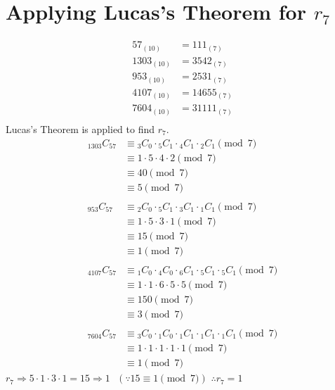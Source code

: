 \documentclass[12pt]{report}
\begin{document}
\section*{Applying Lucas's Theorem for $r_7$}
\begin{align*}
57_{(10)}&=111_{(7)} \\
1303_{(10)}&=3542_{(7)} \\
953_{(10)}&=2531_{(7)} \\
4107_{(10)}&=14655_{(7)} \\
7604_{(10)}&=31111_{(7)} \\
\end{align*}
Lucas's Theorem is applied to find $r_7$.
\begin{align*}
    {}_{1303}C_{57}
    &\equiv {}_{3}C_{0}\cdot{}_{5}C_{1}\cdot{}_{4}C_{1}\cdot{}_{2}C_{1} \pmod{7} \\
    &\equiv 1\cdot5\cdot4\cdot2 \pmod{7} \\
    &\equiv 40 \pmod{7} \\
    &\equiv 5 \pmod{7}
    \\\\
    {}_{953}C_{57}
    &\equiv {}_{2}C_{0}\cdot{}_{5}C_{1}\cdot{}_{3}C_{1}\cdot{}_{1}C_{1} \pmod{7} \\
    &\equiv 1\cdot5\cdot3\cdot1 \pmod{7} \\
    &\equiv 15 \pmod{7} \\
    &\equiv 1 \pmod{7}
    \\\\
    {}_{4107}C_{57}
    &\equiv {}_{1}C_{0}\cdot{}_{4}C_{0}\cdot{}_{6}C_{1}\cdot{}_{5}C_{1}\cdot{}_{5}C_{1} \pmod{7} \\
    &\equiv 1\cdot1\cdot6\cdot5\cdot5 \pmod{7} \\
    &\equiv 150 \pmod{7} \\
    &\equiv 3 \pmod{7}
    \\\\
    {}_{7604}C_{57}
    &\equiv {}_{3}C_{0}\cdot{}_{1}C_{0}\cdot{}_{1}C_{1}\cdot{}_{1}C_{1}\cdot{}_{1}C_{1} \pmod{7} \\
    &\equiv 1\cdot1\cdot1\cdot1\cdot1 \pmod{7} \\
    &\equiv 1 \pmod{7}  
\end{align*}
$r_7 \Rightarrow 5\cdot1\cdot3\cdot1=15\Rightarrow1 \text{ }(\because15 \equiv1 \pmod{7})$
$\therefore r_7=1$
\end{document}

